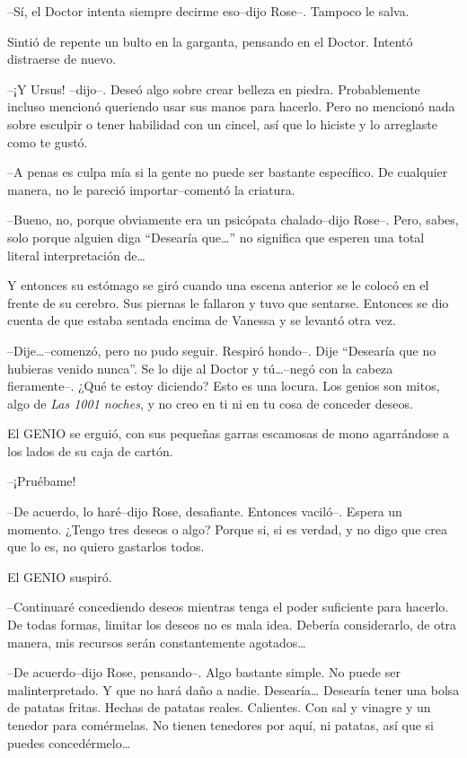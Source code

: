 --Sí, el Doctor intenta siempre decirme eso--dijo Rose--. Tampoco le
salva.

Sintió de repente un bulto en la garganta, pensando en el Doctor.
Intentó distraerse de nuevo.

--¡Y Ursus! --dijo--. Deseó algo sobre crear belleza en piedra.
Probablemente incluso mencionó queriendo usar sus manos para hacerlo.
Pero no mencionó nada sobre esculpir o tener habilidad con un cincel,
así que lo hiciste y lo arreglaste como te gustó.

--A penas es culpa mía si la gente no puede ser bastante específico. De
cualquier manera, no le pareció importar--comentó la criatura.

--Bueno, no, porque obviamente era un psicópata chalado--dijo Rose--.
Pero, sabes, solo porque alguien diga ``Desearía que\ldots{}'' no
significa que esperen una total literal interpretación de\ldots{}

Y entonces su estómago se giró cuando una escena anterior se le colocó
en el frente de su cerebro. Sus piernas le fallaron y tuvo que sentarse.
Entonces se dio cuenta de que estaba sentada encima de Vanessa y se
levantó otra vez.

--Dije\ldots{}--comenzó, pero no pudo seguir. Respiró hondo--. Dije
``Desearía que no hubieras venido nunca''. Se lo dije al Doctor y
tú\ldots{}--negó con la cabeza fieramente--. ¿Qué te estoy diciendo?
Esto es una locura. Los genios son mitos, algo de \emph{Las 1001
noches}, y no creo en ti ni en tu cosa de conceder deseos.

El GENIO se erguió, con sus pequeñas garras escamosas de mono
agarrándose a los lados de su caja de cartón.

--¡Pruébame!

--De acuerdo, lo haré--dijo Rose, desafiante. Entonces vaciló--. Espera
un momento. ¿Tengo tres deseos o algo? Porque si, si es verdad, y no
digo que crea que lo es, no quiero gastarlos todos.

El GENIO suspiró.

--Continuaré concediendo deseos mientras tenga el poder suficiente para
hacerlo. De todas formas, limitar los deseos no es mala idea. Debería
considerarlo, de otra manera, mis recursos serán constantemente
agotados\ldots{}

--De acuerdo--dijo Rose, pensando--. Algo bastante simple. No puede ser
malinterpretado. Y que no hará daño a nadie. Desearía\ldots{} Desearía
tener una bolsa de patatas fritas. Hechas de patatas reales. Calientes.
Con sal y vinagre y un tenedor para comérmelas. No tienen tenedores por
aquí, ni patatas, así que si puedes concedérmelo\ldots{}

